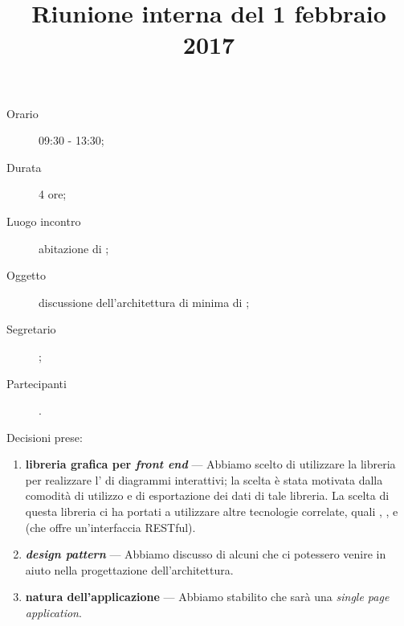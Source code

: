 


\author{\LS}
\supervisor{\LB}
\dest{\ALL}
\title{Riunione interna del 1 febbraio 2017}



\maketitle

\begin{description}
	\item[Orario] 09:30 - 13:30;
	\item[Durata] 4 ore;
	\item[Luogo incontro] abitazione di \LS;
	\item[Oggetto] discussione dell'architettura di minima di \proj{};
	\item[Segretario] \LS; 
	\item[Partecipanti] \ALL.
\end{description}

Decisioni prese:
\begin{enumerate}
	\item \textbf{libreria grafica per \emph{front end}} --- Abbiamo scelto di utilizzare la libreria \jointjs{} per realizzare l' di diagrammi interattivi; la scelta è stata motivata dalla comodità di utilizzo e di esportazione dei dati di tale libreria. La scelta di questa libreria ci ha portati a utilizzare altre tecnologie correlate, quali \html{}, \jquery{}, \lodash{} e \backbonejs{} (che offre un'interfaccia RESTful).
	\item \textbf{\emph{design pattern}} --- Abbiamo discusso di alcuni  che ci potessero venire in aiuto nella progettazione dell'architettura.
	\item \textbf{natura dell'applicazione} --- Abbiamo stabilito che \proj{} sarà una \emph{single page application}.
\end{enumerate}


